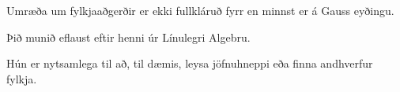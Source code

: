 {
}

{
	{
		\item<1-> Umræða um fylkjaaðgerðir er ekki fullkláruð fyrr en minnst er á Gauss eyðingu.
		\item<2-> Þið munið eflaust eftir henni úr Línulegri Algebru.
		\item<3-> Hún er nytsamlega til að, til dæmis, leysa jöfnuhneppi eða finna andhverfur fylkja.
	}
}

{
}

{
}



